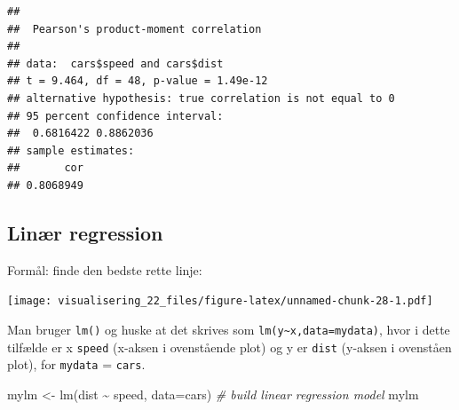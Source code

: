 \documentclass[
]{book}
\newenvironment{Shaded}{\begin{snugshade}}{\end{snugshade}}
\newcommand{\AttributeTok}[1]{\textcolor[rgb]{0.77,0.63,0.00}{#1}}
\newcommand{\CommentTok}[1]{\textcolor[rgb]{0.56,0.35,0.01}{\textit{#1}}}
\newcommand{\FunctionTok}[1]{\textcolor[rgb]{0.00,0.00,0.00}{#1}}
\newcommand{\NormalTok}[1]{#1}
\newcommand{\OtherTok}[1]{\textcolor[rgb]{0.56,0.35,0.01}{#1}}
\newcommand{\SpecialCharTok}[1]{\textcolor[rgb]{0.00,0.00,0.00}{#1}}
\begin{document}
\begin{Shaded}
\end{Shaded}

\begin{verbatim}
## 
##  Pearson's product-moment correlation
## 
## data:  cars$speed and cars$dist
## t = 9.464, df = 48, p-value = 1.49e-12
## alternative hypothesis: true correlation is not equal to 0
## 95 percent confidence interval:
##  0.6816422 0.8862036
## sample estimates:
##       cor 
## 0.8068949
\end{verbatim}

\hypertarget{linuxe6r-regression}{%
\subsection{Linær regression}\label{linuxe6r-regression}}

Formål: finde den bedste rette linje:

\begin{Shaded}
\end{Shaded}

\texttt{[image: visualisering\_22\_files/figure-latex/unnamed-chunk-28-1.pdf]}

Man bruger \texttt{lm()} og huske at det skrives som \texttt{lm(y\textasciitilde{}x,data=mydata)}, hvor i dette tilfælde er x \texttt{speed} (x-aksen i ovenstående plot) og y er \texttt{dist} (y-aksen i ovenståen plot), for \texttt{mydata} = \texttt{cars}.

\begin{Shaded}
\begin{Highlighting}[]
\NormalTok{mylm }\OtherTok{\textless{}{-}} \FunctionTok{lm}\NormalTok{(dist }\SpecialCharTok{\textasciitilde{}}\NormalTok{ speed, }\AttributeTok{data=}\NormalTok{cars)  }\CommentTok{\# build linear regression model}
\NormalTok{mylm}
\end{Highlighting}
\end{Shaded}
\end{document}

